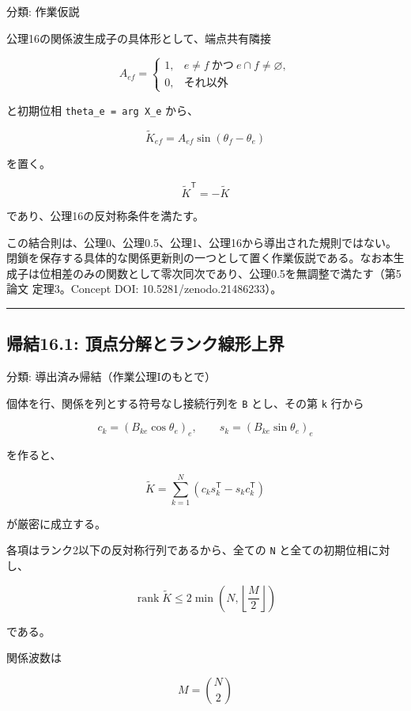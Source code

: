 \documentclass[
  a4paper,
]{ltjsarticle}
\begin{document}
分類: 作業仮説

公理16の関係波生成子の具体形として、端点共有隣接

\[
A_{ef}
=
\begin{cases}
1,& e\ne f\ \text{かつ}\ e\cap f\ne\varnothing,\\
0,& \text{それ以外}
\end{cases}
\]

と初期位相 \texttt{theta\_e\ =\ arg\ X\_e} から、

\[
\widetilde K_{ef}
=
A_{ef}\sin(\theta_f-\theta_e)
\]

を置く。

\[
\widetilde K^{\mathsf T}=-\widetilde K
\]

であり、公理16の反対称条件を満たす。

この結合則は、公理0、公理0.5、公理1、公理16から導出された規則ではない。閉鎖を保存する具体的な関係更新則の一つとして置く作業仮説である。なお本生成子は位相差のみの関数として零次同次であり、公理0.5を無調整で満たす（第5論文
定理3。Concept DOI: 10.5281/zenodo.21486233）。

\begin{center}\rule{0.5\linewidth}{0.5pt}\end{center}

\subsection{帰結16.1:
頂点分解とランク線形上界}\label{ux5e30ux7d5016.1-ux9802ux70b9ux5206ux89e3ux3068ux30e9ux30f3ux30afux7ddaux5f62ux4e0aux754c}

分類: 導出済み帰結（作業公理Iのもとで）

個体を行、関係を列とする符号なし接続行列を \texttt{B} とし、その第
\texttt{k} 行から

\[
c_k=(B_{ke}\cos\theta_e)_{e},
\qquad
s_k=(B_{ke}\sin\theta_e)_{e}
\]

を作ると、

\[
\widetilde K=\sum_{k=1}^{N}\left(c_k s_k^{\mathsf T}-s_k c_k^{\mathsf T}\right)
\]

が厳密に成立する。

各項はランク2以下の反対称行列であるから、全ての \texttt{N}
と全ての初期位相に対し、

\[
\operatorname{rank}\widetilde K
\le
2\min\!\left(N,\left\lfloor\frac{M}{2}\right\rfloor\right)
\]

である。

関係波数は

\[
M=\binom{N}{2}
\]
\end{document}
